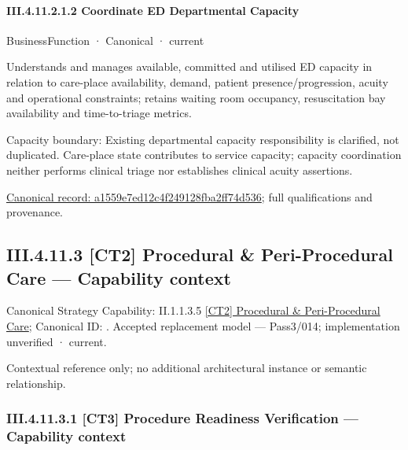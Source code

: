 \paragraph*{III.4.11.2.1.2 Coordinate ED Departmental Capacity}
\label{navigation:III.4.11.2.1.2}

\label{element:a1559e7ed12c4f249128fba2ff74d536}
{\small BusinessFunction · Canonical · current}\par

Understands and manages available, committed and utilised ED capacity in relation to care-place availability, demand, patient presence/progression, acuity and operational constraints; retains waiting room occupancy, resuscitation bay availability and time-to-triage metrics.



Capacity boundary: Existing departmental capacity responsibility is clarified, not duplicated. Care-place state contributes to service capacity; capacity coordination neither performs clinical triage nor establishes clinical acuity assertions.


{\footnotesize \href{../../../../../../../../continuum/business/business-function/a1559e7ed12c4f249128fba2ff74d536.md}{Canonical record: a1559e7ed12c4f249128fba2ff74d536}; full qualifications and provenance.}\par
\subsection*{III.4.11.3 [CT2] Procedural \& Peri-Procedural Care — Capability context}
\label{navigation:III.4.11.3}

{\small Canonical Strategy Capability: II.1.1.3.5 \hyperref[element:2f1e08ecaf7e4d589582c26d7e8966f1]{[CT2] Procedural \& Peri-Procedural Care}; Canonical ID: \texttt{}. Accepted replacement model — Pass3/014; implementation unverified · current.}\par
Contextual reference only; no additional architectural instance or semantic relationship.\par
\subsubsection*{III.4.11.3.1 [CT3] Procedure Readiness Verification — Capability context}
\label{navigation:III.4.11.3.1}

